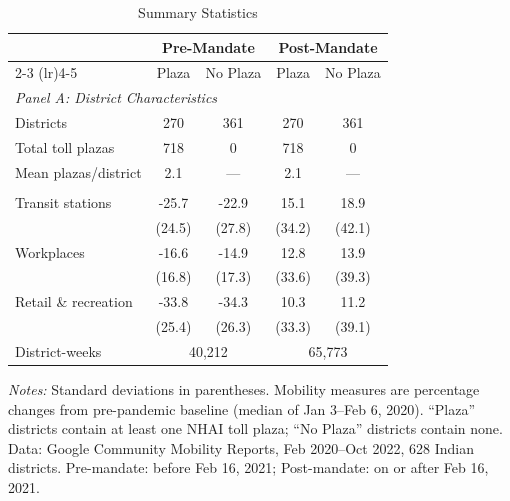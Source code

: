 \begin{table}[t]
\centering
\caption{Summary Statistics}
\label{tab:summary}
\small
\begin{tabular}{lcccc}
\toprule
 & \multicolumn{2}{c}{Pre-Mandate} & \multicolumn{2}{c}{Post-Mandate} \\
\cmidrule(lr){2-3} \cmidrule(lr){4-5}
 & Plaza & No Plaza & Plaza & No Plaza \\
\midrule
\multicolumn{5}{l}{\textit{Panel A: District Characteristics}} \\
Districts & 270 & 361 & 270 & 361 \\
Total toll plazas & 718 & 0 & 718 & 0 \\
Mean plazas/district & 2.1 & --- & 2.1 & --- \\
\addlinespace
\multicolumn{5}{l}{\textit{Panel B: Mobility (\% change from baseline)}} \\
Transit stations & -25.7 & -22.9 & 15.1 & 18.9 \\
 & (24.5) & (27.8) & (34.2) & (42.1) \\
Workplaces & -16.6 & -14.9 & 12.8 & 13.9 \\
 & (16.8) & (17.3) & (33.6) & (39.3) \\
Retail \& recreation & -33.8 & -34.3 & 10.3 & 11.2 \\
 & (25.4) & (26.3) & (33.3) & (39.1) \\
\addlinespace
District-weeks & \multicolumn{2}{c}{40,212} & \multicolumn{2}{c}{65,773} \\
\bottomrule
\end{tabular}
\begin{tablenotes}
\item \textit{Notes:} Standard deviations in parentheses. Mobility measures are percentage changes from pre-pandemic baseline (median of Jan 3--Feb 6, 2020). ``Plaza'' districts contain at least one NHAI toll plaza; ``No Plaza'' districts contain none. Data: Google Community Mobility Reports, Feb 2020--Oct 2022, 628 Indian districts. Pre-mandate: before Feb 16, 2021; Post-mandate: on or after Feb 16, 2021.
\end{tablenotes}
\end{table}

